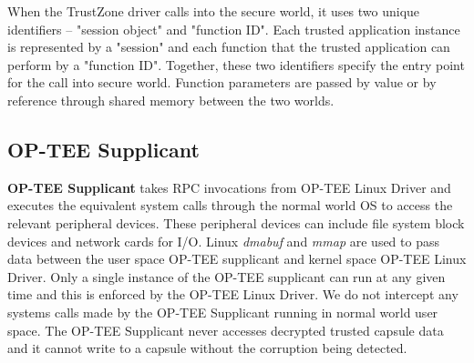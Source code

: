 When the TrustZone driver calls into the secure world, it uses two unique identifiers -- "session 
object" and "function ID". Each trusted application instance is represented by a "session" and each 
function that the trusted application can perform by a "function ID". Together, these two identifiers 
specify the entry point for the call into secure world. Function parameters are passed by value or by 
reference through shared memory between the two worlds. 


\subsection{OP-TEE Supplicant}

\textbf{OP-TEE Supplicant} takes RPC invocations from OP-TEE Linux Driver and executes the equivalent 
system calls through the normal world OS to access the relevant peripheral devices. These peripheral 
devices can include file system block devices and network cards for I/O. 
Linux \textit{dmabuf} and \textit{mmap} are used to pass data between the user space
OP-TEE supplicant and kernel space OP-TEE Linux Driver. 
Only a single instance of the OP-TEE supplicant 
can run at any given time and this is enforced by the OP-TEE Linux Driver. We do not intercept any 
systems calls made by the OP-TEE Supplicant running in normal world user space. 
The OP-TEE Supplicant never accesses decrypted trusted capsule data and it
cannot write to a capsule without the corruption being detected.  